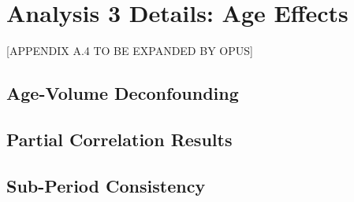 \section{Analysis 3 Details: Age Effects}
\label{sec:A4}

[APPENDIX A.4 TO BE EXPANDED BY OPUS]

\subsection{Age-Volume Deconfounding}

\subsection{Partial Correlation Results}

\subsection{Sub-Period Consistency}
